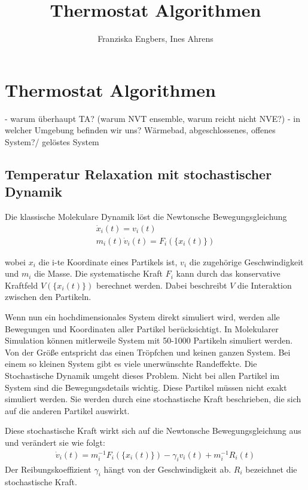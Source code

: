 \documentclass[]{article}
\title{Thermostat Algorithmen}
\author{Franziska Engbers, Ines Ahrens}
\begin{document}
\maketitle

\section{Thermostat Algorithmen}

- warum überhaupt TA? (warum NVT ensemble, warum reicht nicht NVE?)
- in welcher Umgebung befinden wir uns?  Wärmebad, abgeschlossenes, offenes System?/ gelöstes System

\subsection{Temperatur Relaxation mit stochastischer Dynamik}

Die klassische Molekulare Dynamik löst die Newtonsche Bewegungsgleichung
\begin{align*}
	\dot{x}_i(t) = v_i(t) \\
	m_i(t) \dot{v}_i(t) = F_i(\{ x_i(t)\}) 
\end{align*}

wobei $x_i$ die i-te Koordinate eines Partikels ist, $v_i$ die zugehörige Geschwindigkeit und $m_i$ die Masse. Die systematische Kraft $F_i$ kann durch das konservative Kraftfeld $V(\{x_i(t)\})$ berechnet werden. Dabei beschreibt $V$ die Interaktion zwischen den Partikeln.   

Wenn nun ein hochdimensionales System direkt simuliert wird, werden alle Bewegungen und Koordinaten aller Partikel berücksichtigt. In Molekularer Simulation können mitlerweile System mit 50-1000 Partikeln simuliert werden. Von der Größe entspricht das einen Tröpfchen und keinen ganzen System. Bei einem so kleinen System gibt es viele unerwünschte Randeffekte. 
Die Stochastische Dynamik umgeht dieses Problem. Nicht bei allen Partikel im System sind die Bewegungsdetails wichtig. Diese Partikel müssen nicht exakt simuliert werden. Sie werden durch eine stochastische Kraft beschrieben, die sich auf die anderen Partikel auswirkt. 

Diese stochastische Kraft wirkt sich auf die Newtonsche Bewegungsgleichung aus und verändert sie wie folgt:
\begin{align*}
	\dot{v}_i(t)  = m_i^{-1} F_i(\{x_i(t)\}) - \gamma_i v_i(t) + m_i^{-1} R_i(t)
\end{align*}
Der Reibungskoeffizient $\gamma_i$ hängt von der Geschwindigkeit ab. $R_i$ bezeichnet die stochastische Kraft.
\end{document}
